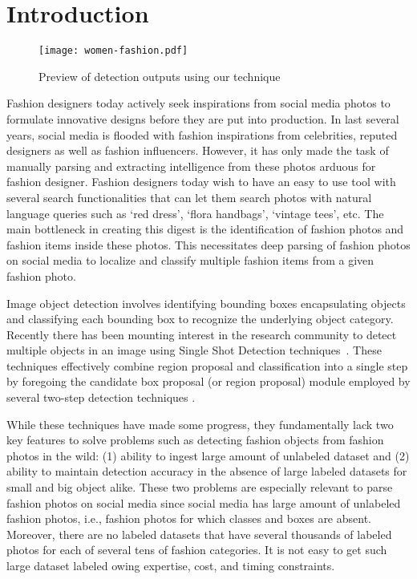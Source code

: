 \documentclass[sigconf]{acmart}
\begin{document}

\maketitle

\section{Introduction}


\begin{figure*}
\centering
\texttt{[image: women-fashion.pdf]}
\caption{Preview of detection outputs using our technique}
\label{fig:ssd-stairnet-bssd}
\end{figure*}


Fashion designers today actively seek inspirations from
social media photos to formulate 
innovative designs before they are put into production.
In last several years,
social media is flooded with fashion inspirations
from celebrities, reputed designers as well as fashion influencers.
However, it has only made the task of manually parsing and extracting intelligence
from these photos arduous for fashion designer.
Fashion designers today wish to have 
an easy to use tool with several search functionalities 
that can let them search
photos with natural language queries 
such as `red dress', `flora handbags', `vintage tees', etc.
The main bottleneck in creating this digest is
the identification of fashion photos and fashion items
inside these photos.
This necessitates deep
parsing of fashion photos on social media to localize and classify
multiple fashion items from a given fashion photo.


Image object detection involves
identifying bounding boxes encapsulating objects 
and classifying each bounding box to recognize
the underlying object category.
Recently
there has been mounting interest in the research
community to detect multiple objects
in an image using Single Shot Detection techniques~\cite{LiuAESRFB16,RedmonCVPR16}.
These techniques effectively combine region proposal
and classification into a single step
by foregoing the candidate box proposal (or region proposal)
module employed by several two-step detection techniques
\cite{GirshickIccv15FastRCNN,GirshickCvpr14RCNN,FasterRCNNNips15,ion16,fpn16}.

While these techniques have made some progress,
they fundamentally lack two key features to
solve problems such as detecting fashion objects
from fashion photos in the wild:
(1) ability to ingest large amount of unlabeled
dataset and (2) ability to maintain detection accuracy
in the absence of large labeled datasets for small
and big object alike.
These two problems are especially relevant to parse
fashion photos on social media since social media
has large amount of unlabeled fashion photos,
i.e., fashion photos for which classes and boxes
are absent.
Moreover, there are no labeled datasets that have several thousands
of labeled photos for each of several tens of fashion
categories.
It is not easy to get such large dataset labeled
owing expertise, cost, and timing constraints.
\end{document}

